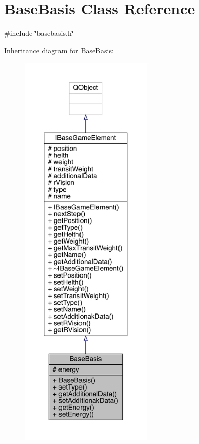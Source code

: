 \hypertarget{a00149}{}\section{Base\+Basis Class Reference}
\label{a00149}


{\ttfamily \#include \char`\"{}basebasis.\+h\char`\"{}}



Inheritance diagram for Base\+Basis\+:
\nopagebreak
\begin{figure}[H]
\begin{center}
\leavevmode
\includegraphics[height=550pt]{db/d48/a00148}
\end{center}
\end{figure}


